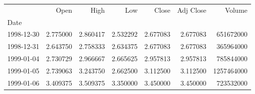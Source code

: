 \begin{tabular}{lrrrrrr}
\toprule
{} &      Open &      High &       Low &     Close &  Adj Close &      Volume \\
Date       &           &           &           &           &            &             \\
\midrule
1998-12-30 &  2.775000 &  2.860417 &  2.532292 &  2.677083 &   2.677083 &   651672000 \\
1998-12-31 &  2.643750 &  2.758333 &  2.634375 &  2.677083 &   2.677083 &   365964000 \\
1999-01-04 &  2.730729 &  2.966667 &  2.665625 &  2.957813 &   2.957813 &   785844000 \\
1999-01-05 &  2.739063 &  3.243750 &  2.662500 &  3.112500 &   3.112500 &  1257464000 \\
1999-01-06 &  3.409375 &  3.509375 &  3.350000 &  3.450000 &   3.450000 &   723532000 \\
\bottomrule
\end{tabular}
